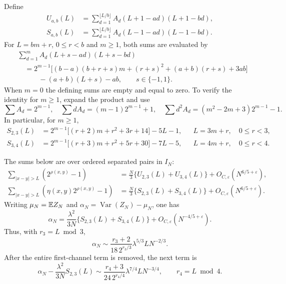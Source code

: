 Define
\begin{align*}
 U_{a,b}(L)&=\sum_{d=1}^{\lfloor L/b\rfloor}
            A_d(L+1-ad)(L+1-bd),\\
 S_{a,b}(L)&=\sum_{d=1}^{\lfloor L/b\rfloor}
            A_d(L-1-ad)(L-1-bd).
\end{align*}
For $L=bm+r$, $0\leq r<b$ and $m\geq1$, both sums are evaluated by
\begin{equation}\label{p1:arith:channelidentity}
 \begin{split}
 &\sum_{d=1}^{m}A_d(L+s-ad)(L+s-bd)\\
 &\quad=2^{m-1}\big[(b-a)(b+r+s)m+(r+s)^2
                   +(a+b)(r+s)+3ab\big]\\
 &\qquad\quad -(a+b)(L+s)-ab,\qquad s\in\{-1,1\}.
 \end{split}
\end{equation}
When $m=0$ the defining sums are empty and equal to zero.
To verify the identity for $m\geq1$, expand the product and use
\[
 \sum A_d=2^{m-1},\quad
 \sum dA_d=(m-1)2^{m-1}+1,\quad
 \sum d^2A_d=(m^2-2m+3)2^{m-1}-1.
\]
In particular, for $m\geq1$,
\begin{align}
 S_{2,3}(L)&=2^{m-1}\big[(r+2)m+r^2+3r+14\big]-5L-1,
       &&L=3m+r,\quad0\leq r<3,\label{p1:arith:S23}\\
 S_{3,4}(L)&=2^{m-1}\big[(r+3)m+r^2+5r+30\big]-7L-5,
       &&L=4m+r,\quad0\leq r<4.\label{p1:arith:S34}
\end{align}

\begin{theorem}\label{p1:arith:pairs}
The sums below are over ordered separated pairs in $I_N$:
\begin{align}
 \sum_{|x-y|>L}(2^{\rho(x,y)}-1)
 &=\frac N3\{U_{2,3}(L)+U_{3,4}(L)\}
      +O_{C,\varepsilon}(N^{6/5+\varepsilon}),\label{p1:arith:positiveprofile}\\
 \sum_{|x-y|>L}(\eta(x,y)2^{\rho(x,y)}-1)
 &=\frac N3\{S_{2,3}(L)+S_{3,4}(L)\}
      +O_{C,\varepsilon}(N^{6/5+\varepsilon}).\label{p1:arith:signedprofile}
\end{align}
Writing $\mu_N=\mathbb E Z_N$ and $\alpha_N=\operatorname{Var}(Z_N)-\mu_N$, one has
\begin{equation}\label{p1:arith:cumulantexpansion}
 \alpha_N=\frac{\lambda^2}{3N}\{S_{2,3}(L)+S_{3,4}(L)\}
            +O_{C,\varepsilon}(N^{-4/5+\varepsilon}).
\end{equation}
Thus, with $r_3=L\bmod3$,
\begin{equation}\label{p1:arith:leadingphase}
 \alpha_N\sim
 \frac{r_3+2}{18\,2^{r_3/3}}\lambda^{5/3}L N^{-2/3}.
\end{equation}
After the entire first-channel term is removed, the next term is
\begin{equation}\label{p1:arith:secondphase}
 \alpha_N-\frac{\lambda^2}{3N}S_{2,3}(L)
 \sim\frac{r_4+3}{24\,2^{r_4/4}}\lambda^{7/4}L N^{-3/4},
 \qquad r_4=L\bmod4.
\end{equation}
\end{theorem}

